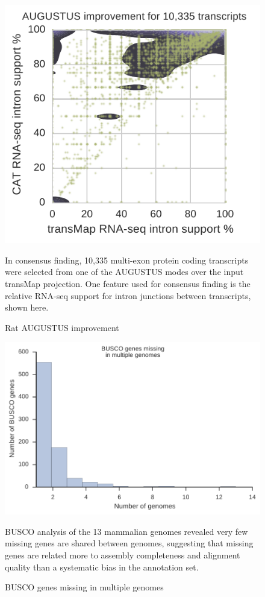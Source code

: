 \documentclass[fleqn,10pt]{wlscirep}
\begin{document}
\begin{figure}
\centering
\includegraphics[width=\textwidth,height=\textheight,keepaspectratio]{augustus_rna_improvement_density_shade.pdf}
\caption{Rat AUGUSTUS improvement}
In consensus finding, 10,335 multi-exon protein coding transcripts were selected from one of the AUGUSTUS modes over the input transMap projection. One feature used for consensus finding is the relative RNA-seq support for intron junctions between transcripts, shown here. 
\label{supp_fig:augustus_rna_rat}
\end{figure}

\begin{figure}
\centering
\includegraphics[]{busco_missing.pdf}
\caption{BUSCO genes missing in multiple genomes}
BUSCO analysis of the 13 mammalian genomes revealed very few missing genes are shared between genomes, suggesting that missing genes are related more to assembly completeness and alignment quality than a systematic bias in the annotation set.
\label{supp_fig:busco_missing}
\end{figure}
\end{document}
